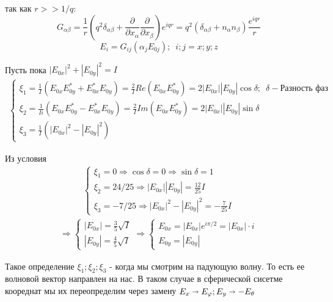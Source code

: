 \documentclass[12pt]{article}
\begin{document}
\begin{large}
\[\]
\par так как $r >> 1/q$:
\[
    G_{\alpha \beta } = \frac{1}{r} \left( q^2 \delta_{\alpha \beta} + \frac{\partial }{\partial x_\alpha}\frac{\partial }{\partial x_\beta} \right)e^{iqr} = q^2 \left( \delta_{\alpha \beta} + n_\alpha n_\beta \right) \frac{e^{iqr}}{r}
\]
\[
    E_i = G_{ij}\left( \alpha_j E_{0j} \right) ;  \, \, \, i; j = x; y; z
\]
\par Пусть пока $|E_{0x}|^2 + |E_{0y}|^2 = I$
\begin{eqnarray*}
    \begin{cases}
        \xi_1 = \frac{1}{I}\left( E_{0x}E_{0y}^* + E_{0x}^*E_{0y} \right) = \frac{2}{I} Re\left( E_{0x}E_{0y}^* \right) = 2|E_{0x}||E_{0y}| \cos \delta ; \,\,\, \delta - \text{Разность фаз} \\
        \xi_2 = \frac{1}{I i}\left( E_{0x}E_{0y}^* - E_{0x}^*E_{0y} \right) = \frac{2}{I} Im\left( E_{0x}E_{0y}^* \right) = 2|E_{0x}||E_{0y}| \sin \delta \\
        \xi_3 = \frac{1}{I} \left( |E_{0x}|^2 - |E_{0y}|^2 \right)
    \end{cases}
\end{eqnarray*}
\par Из условия
\begin{eqnarray*}
    \begin{cases}
        \xi_1 = 0 \Rightarrow \cos \delta = 0  \Rightarrow \sin \delta = 1 \\
        \xi_2 = 24/25 \Rightarrow |E_{0x}||E_{0y}| = \frac{12}{25}I \\
        \xi_3 = -7/25 \Rightarrow |E_{0x}|^2 - |E_{0y}|^2 = -\frac{7}{25}I
    \end{cases}
\end{eqnarray*}
\begin{eqnarray*}
    \Rightarrow
    \begin{cases}
        |E_{0x}| = \frac{3}{5}\sqrt{I} \\
        |E_{0y}| = \frac{4}{5}\sqrt{I}
    \end{cases}
    \Rightarrow
    \begin{cases}
        E_{0x} = |E_{0x}| e^{i \pi /2} = |E_{0x}| \cdot i\\
        E_{0y} = |E_{0y}|
    \end{cases}
\end{eqnarray*}
\par Такое определение $\xi_1; \xi_2; \xi_3$ - когда мы смотрим на падующую волну. То есть ее волновой вектор направлен на нас. В таком случае в сферической сисетме коореднат мы их переопределим через замену $E_x \shortrightarrow E_\varphi ; E_y \shortrightarrow - E_\theta $

\end{large}
\end{document}

